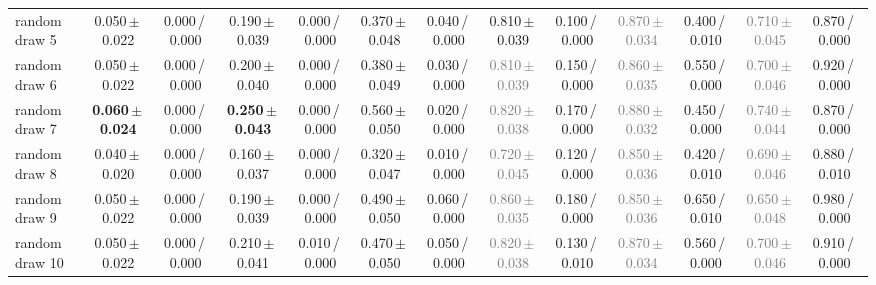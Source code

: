 \begin{tabular}{@{}lcccccccccccc@{}}
\midrule
random draw 5 & 0.050\,{\scriptsize$\pm$\,0.022} & {\scriptsize 0.000\,/\,0.000} & 0.190\,{\scriptsize$\pm$\,0.039} & {\scriptsize 0.000\,/\,0.000} & 0.370\,{\scriptsize$\pm$\,0.048} & {\scriptsize 0.040\,/\,0.000} & 0.810\,{\scriptsize$\pm$\,0.039} & {\scriptsize 0.100\,/\,0.000} & \textcolor{gray}{0.870\,{\scriptsize$\pm$\,0.034}} & {\scriptsize 0.400\,/\,0.010} & \textcolor{gray}{0.710\,{\scriptsize$\pm$\,0.045}} & {\scriptsize 0.870\,/\,0.000} \\
random draw 6 & 0.050\,{\scriptsize$\pm$\,0.022} & {\scriptsize 0.000\,/\,0.000} & 0.200\,{\scriptsize$\pm$\,0.040} & {\scriptsize 0.000\,/\,0.000} & 0.380\,{\scriptsize$\pm$\,0.049} & {\scriptsize 0.030\,/\,0.000} & \textcolor{gray}{0.810\,{\scriptsize$\pm$\,0.039}} & {\scriptsize 0.150\,/\,0.000} & \textcolor{gray}{0.860\,{\scriptsize$\pm$\,0.035}} & {\scriptsize 0.550\,/\,0.000} & \textcolor{gray}{0.700\,{\scriptsize$\pm$\,0.046}} & {\scriptsize 0.920\,/\,0.000} \\
random draw 7 & \textbf{0.060\,{\scriptsize$\pm$\,0.024}} & {\scriptsize 0.000\,/\,0.000} & \textbf{0.250\,{\scriptsize$\pm$\,0.043}} & {\scriptsize 0.000\,/\,0.000} & 0.560\,{\scriptsize$\pm$\,0.050} & {\scriptsize 0.020\,/\,0.000} & \textcolor{gray}{0.820\,{\scriptsize$\pm$\,0.038}} & {\scriptsize 0.170\,/\,0.000} & \textcolor{gray}{0.880\,{\scriptsize$\pm$\,0.032}} & {\scriptsize 0.450\,/\,0.000} & \textcolor{gray}{0.740\,{\scriptsize$\pm$\,0.044}} & {\scriptsize 0.870\,/\,0.000} \\
random draw 8 & 0.040\,{\scriptsize$\pm$\,0.020} & {\scriptsize 0.000\,/\,0.000} & 0.160\,{\scriptsize$\pm$\,0.037} & {\scriptsize 0.000\,/\,0.000} & 0.320\,{\scriptsize$\pm$\,0.047} & {\scriptsize 0.010\,/\,0.000} & \textcolor{gray}{0.720\,{\scriptsize$\pm$\,0.045}} & {\scriptsize 0.120\,/\,0.000} & \textcolor{gray}{0.850\,{\scriptsize$\pm$\,0.036}} & {\scriptsize 0.420\,/\,0.010} & \textcolor{gray}{0.690\,{\scriptsize$\pm$\,0.046}} & {\scriptsize 0.880\,/\,0.010} \\
random draw 9 & 0.050\,{\scriptsize$\pm$\,0.022} & {\scriptsize 0.000\,/\,0.000} & 0.190\,{\scriptsize$\pm$\,0.039} & {\scriptsize 0.000\,/\,0.000} & 0.490\,{\scriptsize$\pm$\,0.050} & {\scriptsize 0.060\,/\,0.000} & \textcolor{gray}{0.860\,{\scriptsize$\pm$\,0.035}} & {\scriptsize 0.180\,/\,0.000} & \textcolor{gray}{0.850\,{\scriptsize$\pm$\,0.036}} & {\scriptsize 0.650\,/\,0.010} & \textcolor{gray}{0.650\,{\scriptsize$\pm$\,0.048}} & {\scriptsize 0.980\,/\,0.000} \\
random draw 10 & 0.050\,{\scriptsize$\pm$\,0.022} & {\scriptsize 0.000\,/\,0.000} & 0.210\,{\scriptsize$\pm$\,0.041} & {\scriptsize 0.010\,/\,0.000} & 0.470\,{\scriptsize$\pm$\,0.050} & {\scriptsize 0.050\,/\,0.000} & \textcolor{gray}{0.820\,{\scriptsize$\pm$\,0.038}} & {\scriptsize 0.130\,/\,0.010} & \textcolor{gray}{0.870\,{\scriptsize$\pm$\,0.034}} & {\scriptsize 0.560\,/\,0.000} & \textcolor{gray}{0.700\,{\scriptsize$\pm$\,0.046}} & {\scriptsize 0.910\,/\,0.000} \\

\end{tabular}
